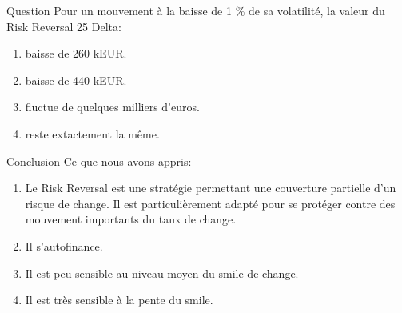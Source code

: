 \documentclass{beamer}
\begin{document}
\begin{frame}{Question}
Pour un mouvement à la baisse de 1 \% de sa volatilité, la valeur du Risk Reversal 25 Delta:\\
\begin{enumerate}
\item baisse de 260 kEUR.
\item baisse de 440 kEUR.
\item fluctue de quelques milliers d'euros.
\item reste extactement la même.
\end{enumerate}
\end{frame}

\begin{frame}{Conclusion}
Ce que nous avons appris:
\begin{enumerate}
\item<2-> Le Risk Reversal est une stratégie permettant une couverture partielle d'un risque de change. Il est particulièrement adapté pour se protéger contre des mouvement importants du taux de change.
\item<3-> Il s'autofinance.
\item<4-> Il est peu sensible au niveau moyen du smile de change.
\item<5-> Il est très sensible à la pente du smile. 
\end{enumerate}
\end{frame}
\end{document}
